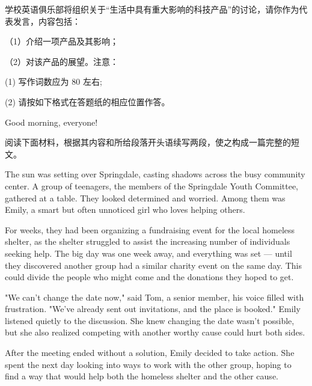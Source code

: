 \documentclass{英语试卷}
\begin{document}
\par 学校英语俱乐部将组织关于“生活中具有重大影响的科技产品”的讨论，请你作为代表发言，内容包括：\par
\par （1）介绍一项产品及其影响；\par
\par （2）对该产品的展望。注意：\par
\par (1) 写作词数应为 80 左右;\par
\par (2) 请按如下格式在答题纸的相应位置作答。\par
\par Good morning, everyone!\par
{}
\par 阅读下面材料，根据其内容和所给段落开头语续写两段，使之构成一篇完整的短文。\par
\par The sun was setting over Springdale, casting shadows across the busy community center. A group of teenagers, the members of the Springdale Youth Committee, gathered at a table. They looked determined and worried. Among them was Emily, a smart but often unnoticed girl who loves helping others.\par
\par For weeks, they had been organizing a fundraising event for the local homeless shelter, as the shelter struggled to assist the increasing number of individuals seeking help. The big day was one week away, and everything was set — until they discovered another group had a similar charity event on the same day. This could divide the people who might come and the donations they hoped to get.\par
\par "We can't change the date now," said Tom, a senior member, his voice filled with frustration. "We've already sent out invitations, and the place is booked." Emily listened quietly to the discussion. She knew changing the date wasn't possible, but she also realized competing with another worthy cause could hurt both sides.\par
\par After the meeting ended without a solution, Emily decided to take action. She spent the next day looking into ways to work with the other group, hoping to find a way that would help both the homeless shelter and the other cause.\par
\end{document}
